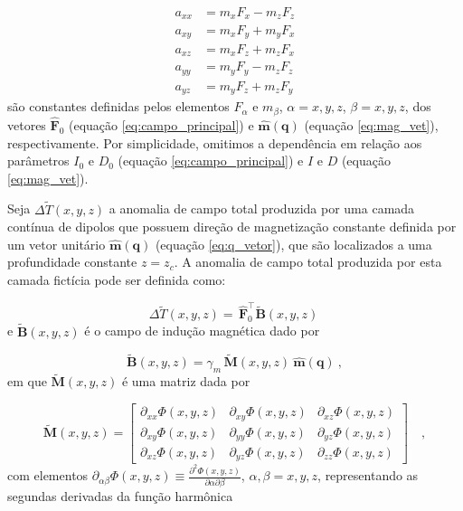 \begin{equation}
	\begin{split}
		a_{xx} &= m_{x} F_{x} - m_{z} F_{z} \\
		a_{xy} &= m_{x} F_{y} + m_{y} F_{x} \\
		a_{xz} &= m_{x} F_{z} + m_{z} F_{x} \\
		a_{yy} &= m_{y} F_{y} - m_{z} F_{z} \\
		a_{yz} &= m_{y} F_{z} + m_{z} F_{y}
	\end{split}
\label{eq:a-coefficients}
\end{equation}
são constantes definidas pelos elementos $F_{\alpha}$ e $m_{\beta}$, $\alpha = x, y, z$, $\beta = x, y, z$, dos vetores $\hat{\mathbf{F}}_{0}$ (equação \ref{eq:campo_principal}) e $\hat{\mathbf{m}}(\mathbf{q})$ (equação \ref{eq:mag_vet}), respectivamente. Por simplicidade, omitimos a dependência em relação aos parâmetros $I_{0}$ e $D_{0}$ (equação \ref{eq:campo_principal}) e $I$ e $D$ (equação \ref{eq:mag_vet}).

Seja $\Delta \tilde{T}(x, y, z)$ a anomalia de campo total produzida por uma camada contínua de dipolos que possuem direção de magnetização constante definida por um vetor unitário $\hat{\mathbf{m}}(\mathbf{q})$ (equação \ref{eq:q_vetor}), que são localizados a uma profundidade constante $z=z_c$. A anomalia de campo total produzida por esta camada fictícia pode ser definida como: 

\begin{equation}
	\Delta \tilde{T}(x, y, z) = \, \hat{\mathbf{F}}_{0}^{\top} \tilde{\mathbf{B}}(x, y, z) \: 
	\label{eq:tfanomaly-eqlayer}
\end{equation}
e $\tilde{\mathbf{B}}(x, y, z)$ é o campo de indução magnética dado por 

\begin{equation}
	\tilde{\mathbf{B}}(x, y, z) = \gamma_{m} \, \tilde{\mathbf{M}}(x, y, z) \: \hat{\mathbf{m}}(\mathbf{q}) \: ,
	\label{eq:inducao_eqlayer}
\end{equation}
em que $\tilde{\mathbf{M}}(x, y, z)$ é uma matriz dada por 

\begin{equation}
	\tilde{\mathbf{M}}(x, y, z) = \begin{bmatrix}
		\partial_{xx} \Phi(x, y, z) & 
		\partial_{xy} \Phi(x, y, z) &
		\partial_{xz} \Phi(x, y, z) \\
		\partial_{xy} \Phi(x, y, z) & 
		\partial_{yy} \Phi(x, y, z) &
		\partial_{yz} \Phi(x, y, z) \\
		\partial_{xz} \Phi(x, y, z) & 
		\partial_{yz} \Phi(x, y, z) &
		\partial_{zz} \Phi(x, y, z)
	\end{bmatrix} \quad ,
	\label{eq:M-matrix-eqlayer}
\end{equation}
com elementos $\partial_{\alpha\beta} \Phi(x, y, z) \equiv \frac{\partial^{2} \Phi(x, y, z)}{\partial \alpha \partial \beta}$, $\alpha, \beta = x, y, z$, representando as segundas derivadas da função harmônica 

